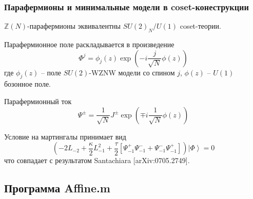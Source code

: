 \documentclass[pdftex]{beamer}
\theoremstyle{definition} \newtheorem{Def}{Определение}
\begin{document}
\begin{frame}
  \frametitle{Парафермионы и минимальные модели в coset-конеструкции}
  $\mathbb{Z}(N)$-парафермионы эквивалентны $SU(2)_{N}/U(1)$ coset-теории.
  
  Парафермионное поле раскладывается в произведение
  \begin{equation*}
    \Phi^{j}=\phi_{j}(z) \exp\left( -i \frac{j}{\sqrt{N}}\phi(z)\right)
  \end{equation*}
  где $\phi_{j}(z)$ -- поле $SU(2)$-WZNW модели со спином $j$, $\phi(z)$ -- $U(1)$ бозонное поле.
  
  Парафермионный ток
  \begin{equation*}
    \Psi^{\pm}=\frac{1}{\sqrt{N}} J^{\pm}\exp\left(\mp i \frac{1}{\sqrt{N}}\phi(z)\right)
  \end{equation*}

  Условие на мартингалы принимает вид
  \begin{equation*}
    \left(-2 L_{-2}+\frac{\kappa}{2}L_{-1}^{2}+\frac{\tau}{2}\left[\Psi^{+}_{-1}\Psi^{-}_{-1}+\Psi^{-}_{-1}\Psi^{+}_{-1}\right]\right) \left|\Phi\right>=0
  \end{equation*}
  что совпадает с результатом Santachiara [arXiv:0705.2749].
\end{frame}

\subsection{Программа Affine.m}
\label{sec:-affine.m}
\end{document}
